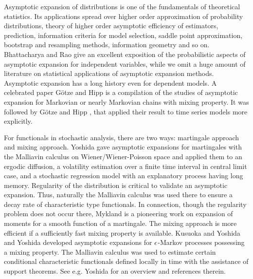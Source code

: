 \documentclass[a4paper]{article}
\numberwithin{equation}{section}
\begin{document}
Asymptotic expansion of distributions is one of the fundamentals of theoretical statistics. 
Its applications spread over higher order approximation of probability distributions, 
theory of higher order asymptotic efficiency of estimators, 
prediction, information criteria for model selection, saddle point approximation, 
bootstrap and resampling methods, information geometry and so on. 
Bhattacharya and Rao \cite{bhattacharya2010normal} give an excellent exposition of the probabilistic aspects 
of asymptotic expansion for independent variables, while we omit a huge amount of literature 
on statistical applications of asymptotic expansion methods. 
Asymptotic expansion has a long history even for dependent models. 
A celebrated paper G\"otze and Hipp \cite{GotzeHipp1983} is a  compilation of the studies 
of asymptotic expansion for Markovian or nearly Markovian chains with mixing property. 
It was followed by G\"otze and Hipp \cite{GotzeHipp1994}, that applied their result to time series models 
more explicitly. 

For functionals in stochastic analysis, there are two ways: 
martingale approach and mixing approach. 
Yoshida \cite{Yoshida1997,yoshida2001malliavin} gave asymptotic expansions for martingales 
with the Malliavin calculus on Wiener/Wiener-Poisson space 
and applied them to an ergodic diffusion, a volatility estimation over a finite time interval in central limit case, 
and a stochastic regression model with an explanatory process having long memory. 
Regularity of the distribution is critical to validate an asymptotic expansion. 
Thus, naturally the Malliavin calculus was used there to ensure a decay rate of 
 characteristic type functionals. 
In connection, though the regularity problem does not occur there, 
Mykland \cite{Mykland1992} is a pioneering work on expansion of moments for a smooth function of a martingale. 
%
The mixing approach is more efficient if a sufficiently fast mixing property is available. 
Kusuoka and Yoshida \cite{KusuokaYoshida2000} and 
Yoshida \cite{yoshida2004partial} developed asymptotic expansions 
for $\epsilon$-Markov processes possessing a mixing property. 
The Malliavin calculus was used to estimate 
certain conditional characteristic functionals defined locally in time with the assistance of support theorems. 
See e.g. Yoshida \cite{yoshida2016asymptotic} for an overview  
and references therein. 
\end{document}
